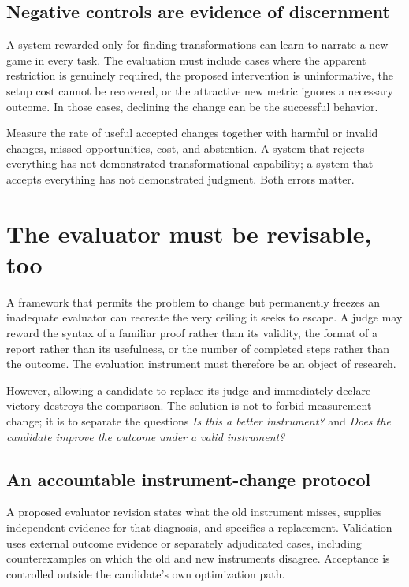 \documentclass[11pt,letterpaper]{article}
\theoremstyle{remark}\newtheorem{remark}{Remark}[section]
\begin{document}
\subsection{Negative controls are evidence of discernment}
A system rewarded only for finding transformations can learn to narrate a new game in every task. The evaluation must include cases where the apparent restriction is genuinely required, the proposed intervention is uninformative, the setup cost cannot be recovered, or the attractive new metric ignores a necessary outcome. In those cases, declining the change can be the successful behavior.

Measure the rate of useful accepted changes together with harmful or invalid changes, missed opportunities, cost, and abstention. A system that rejects everything has not demonstrated transformational capability; a system that accepts everything has not demonstrated judgment. Both errors matter.

\section{The evaluator must be revisable, too}
\label{sec:evaluator}
A framework that permits the problem to change but permanently freezes an inadequate evaluator can recreate the very ceiling it seeks to escape. A judge may reward the syntax of a familiar proof rather than its validity, the format of a report rather than its usefulness, or the number of completed steps rather than the outcome. The evaluation instrument must therefore be an object of research.

However, allowing a candidate to replace its judge and immediately declare victory destroys the comparison. The solution is not to forbid measurement change; it is to separate the questions \emph{Is this a better instrument?} and \emph{Does the candidate improve the outcome under a valid instrument?}

\subsection{An accountable instrument-change protocol}
A proposed evaluator revision states what the old instrument misses, supplies independent evidence for that diagnosis, and specifies a replacement. Validation uses external outcome evidence or separately adjudicated cases, including counterexamples on which the old and new instruments disagree. Acceptance is controlled outside the candidate's own optimization path.
\end{document}
